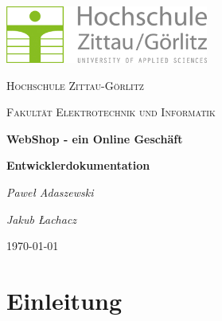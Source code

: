 \documentclass[a4paper,12pt]{article}
\begin{document}
\begin{titlepage}
	\centering
	\includegraphics[width=0.5\textwidth]{Bilder/hszglogo.png}\par\vspace{1cm}
	{\scshape\LARGE Hochschule Zittau-Görlitz \par}
	{\scshape\Large Fakultät Elektrotechnik und Informatik\par}
	\vspace{5cm}
	{\huge\bfseries WebShop - ein Online Geschäft\par}
	{\LARGE\bfseries Entwicklerdokumentation\par}

	\vspace{6cm}
	{\Large\itshape Paweł Adaszewski\par}
	{\Large\itshape Jakub Łachacz\par}


	\vfill

	{\large \today\par}
\end{titlepage}
	\tableofcontents
	\newpage
	\section{Einleitung}
\end{document}
